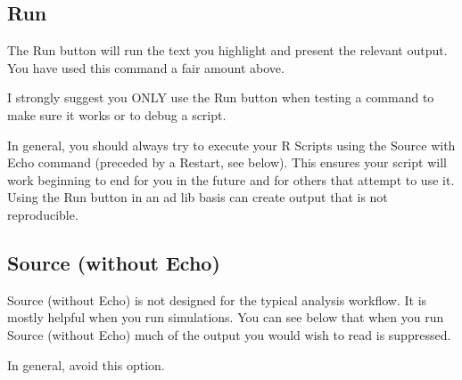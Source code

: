 \documentclass[
]{krantz}
\makeatletter
\newenvironment{Shaded}{\begin{snugshade}}{\end{snugshade}}
\newcommand{\DataTypeTok}[1]{\textcolor[rgb]{0.27,0.27,0.27}{#1}}
\newcommand{\DecValTok}[1]{\textcolor[rgb]{0.06,0.06,0.06}{#1}}
\newcommand{\KeywordTok}[1]{\textcolor[rgb]{0.27,0.27,0.27}{\textbf{#1}}}
\newcommand{\NormalTok}[1]{#1}
\newcommand{\OperatorTok}[1]{\textcolor[rgb]{0.43,0.43,0.43}{\textbf{#1}}}
\newcommand{\StringTok}[1]{\textcolor[rgb]{0.5,0.5,0.5}{#1}}
\newenvironment{kframe}{%
\medskip{}
\setlength{\fboxsep}{.8em}
 \def\at@end@of@kframe{}%
 \ifinner\ifhmode%
  \def\at@end@of@kframe{\end{minipage}}%
  \begin{minipage}{\columnwidth}%
 \fi\fi%
 \def\FrameCommand##1{\hskip\@totalleftmargin \hskip-\fboxsep
 \colorbox{shadecolor}{##1}\hskip-\fboxsep
     \hskip-\linewidth \hskip-\@totalleftmargin \hskip\columnwidth}%
 \MakeFramed {\advance\hsize-\width
   \@totalleftmargin\z@ \linewidth\hsize
   \@setminipage}}%
 {\par\unskip\endMakeFramed%
 \at@end@of@kframe}
\renewenvironment{Shaded}{\begin{kframe}}{\end{kframe}}
\makeatother
\begin{document}
\hypertarget{run}{%
\subsection{Run}\label{run}}

The Run button will run the text you highlight and present the relevant output. You have used this command a fair amount above.

I strongly suggest you ONLY use the Run button when testing a command to make sure it works or to debug a script.

In general, you should always try to execute your R Scripts using the Source with Echo command (preceded by a Restart, see below). This ensures your script will work beginning to end for you in the future and for others that attempt to use it. Using the Run button in an ad lib basis can create output that is not reproducible.

\hypertarget{source-without-echo}{%
\subsection{Source (without Echo)}\label{source-without-echo}}

Source (without Echo) is not designed for the typical analysis workflow. It is mostly helpful when you run simulations. You can see below that when you run Source (without Echo) much of the output you would wish to read is suppressed.

In general, avoid this option.

\begin{Shaded}
\end{Shaded}
\end{document}
